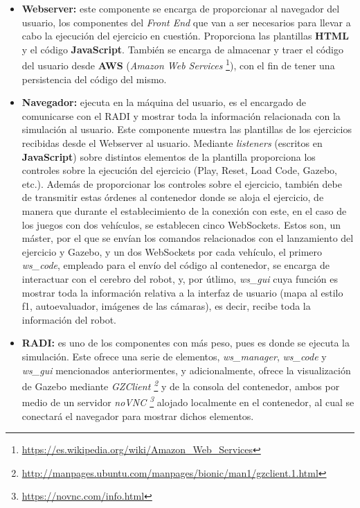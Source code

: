 \documentclass[a4paper, 12pt]{book}
\begin{document}
\begin{itemize}
\item \textbf{Webserver:} este componente se encarga de proporcionar al navegador del usuario, los componentes del \emph{Front End} que van a ser  necesarios para llevar a cabo la ejecución del ejercicio en cuestión. Proporciona las plantillas \textbf{HTML} y el código \textbf{JavaScript}. También se encarga de almacenar y traer el código del usuario desde \textbf{AWS} (\emph{Amazon Web Services} \footnote{\url{https://es.wikipedia.org/wiki/Amazon_Web_Services}}), con el fin de tener una persistencia del código del mismo.

\item \textbf{Navegador:} ejecuta en la máquina del usuario, es el encargado de comunicarse con el RADI y mostrar toda la información relacionada con la simulación al usuario. Este componente muestra las plantillas de los ejercicios recibidas desde el Webserver al usuario. Mediante \emph{listeners} (escritos en \textbf{JavaScript}) sobre distintos elementos de la plantilla proporciona los controles sobre la ejecución del ejercicio (Play, Reset, Load Code, Gazebo, etc.). Además de proporcionar los controles sobre el ejercicio, también debe de transmitir estas órdenes al contenedor donde se aloja el ejercicio, de manera que durante el establecimiento de la conexión con este, en el caso de los juegos con dos vehículos, se establecen cinco WebSockets. Estos son, un máster, por el que se envían los comandos relacionados con el lanzamiento del ejercicio y Gazebo, y un dos WebSockets por cada vehículo, el primero \emph{ws\_code}, empleado para el envío del código al contenedor, se encarga de interactuar con el cerebro del robot, y, por útlimo, \emph{ws\_gui} cuya función es mostrar toda la información relativa a la interfaz de usuario (mapa al estilo f1, autoevaluador, imágenes de las cámaras), es decir, recibe toda la información del robot.

\item \textbf{RADI:} es uno de los componentes con más peso, pues es donde se ejecuta la simulación. Este ofrece una serie de elementos,  \emph{ws\_manager}, \emph{ws\_code} y \emph{ws\_gui} mencionados anteriormentes, y adicionalmente, ofrece la visualización de Gazebo mediante \emph{GZClient \footnote{\url{http://manpages.ubuntu.com/manpages/bionic/man1/gzclient.1.html}}} y de la consola del contenedor, ambos por medio de un servidor \emph{noVNC \footnote{\url{https://novnc.com/info.html}}} alojado localmente en el contenedor, al cual se conectará el navegador para mostrar dichos elementos.
\end{itemize}
\end{document}
